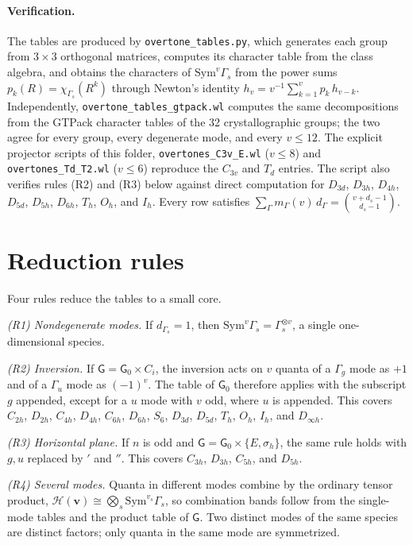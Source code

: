 \documentclass[11pt]{article}
\begin{document}
\paragraph{Verification.} The tables are produced by \texttt{overtone\_tables.py}, which generates each group from $3\times3$ orthogonal matrices, computes its character table from the class algebra, and obtains the characters of $\mathrm{Sym}^v\Gamma_s$ from the power sums $p_k(R)=\chi_{\Gamma_s}(R^k)$ through Newton's identity $h_v=v^{-1}\sum_{k=1}^v p_k\,h_{v-k}$. Independently, \texttt{overtone\_tables\_gtpack.wl} computes the same decompositions from the GTPack character tables of the 32 crystallographic groups; the two agree for every group, every degenerate mode, and every $v\le12$. The explicit projector scripts of this folder, \texttt{overtones\_C3v\_E.wl} ($v\le8$) and \texttt{overtones\_Td\_T2.wl} ($v\le6$) reproduce the $C_{3v}$ and $T_d$ entries. The script also verifies rules (R2) and (R3) below against direct computation for $D_{3d}$, $D_{3h}$, $D_{4h}$, $D_{5d}$, $D_{5h}$, $D_{6h}$, $T_h$, $O_h$, and $I_h$. Every row satisfies $\sum_\Gamma m_\Gamma(v)\,d_\Gamma=\binom{v+d_s-1}{d_s-1}$.

\section{Reduction rules}

Four rules reduce the tables to a small core.

\emph{(R1) Nondegenerate modes.} If $d_{\Gamma_s}=1$, then $\mathrm{Sym}^v\Gamma_s=\Gamma_s^{\otimes v}$, a single one-dimensional species.

\emph{(R2) Inversion.} If $\mathsf G=\mathsf G_0\times C_i$, the inversion acts on $v$ quanta of a $\Gamma_{g}$ mode as $+1$ and of a $\Gamma_{u}$ mode as $(-1)^v$. The table of $\mathsf G_0$ therefore applies with the subscript $g$ appended, except for a $u$ mode with $v$ odd, where $u$ is appended. This covers $C_{2h}$, $D_{2h}$, $C_{4h}$, $D_{4h}$, $C_{6h}$, $D_{6h}$, $S_6$, $D_{3d}$, $D_{5d}$, $T_h$, $O_h$, $I_h$, and $D_{\infty h}$.

\emph{(R3) Horizontal plane.} If $n$ is odd and $\mathsf G=\mathsf G_0\times\{E,\sigma_h\}$, the same rule holds with $g,u$ replaced by $'$ and $''$. This covers $C_{3h}$, $D_{3h}$, $C_{5h}$, and $D_{5h}$.

\emph{(R4) Several modes.} Quanta in different modes combine by the ordinary tensor product, $\mathcal H(\mathbf v)\cong\bigotimes_s\mathrm{Sym}^{v_s}\Gamma_s$, so combination bands follow from the single-mode tables and the product table of $\mathsf G$. Two distinct modes of the same species are distinct factors; only quanta in the same mode are symmetrized.
\end{document}
